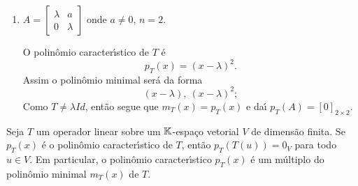 \begin{exemplo}
\begin{enumerate}[label={\arabic*})]
\begin{solucao}
\[\begin{bmatrix}
                    0 & 0 & -2 & 2
                \end{bmatrix}^2 = \begin{bmatrix}
                    0 & 0 & 0 & 0\\
                    0 & 0 & 0 & 0\\
                    0 & 0 & 0 & 0\\
                    0 & 0 & 0 & 0
                \end{bmatrix}.
            \]
            Logo o polin\^omio minimal de $T$ \'e
            \[
                m_T(x) = (x - 3)(x - 2)^2.
            \]
            Note que $p_T(x) = m_T(x)(x - 2)$ e assim $p_T(A) = [0]_{4 \times 4}$.
        \end{solucao}
        \item $A = \begin{bmatrix}
            \lambda & a\\
            0 & \lambda
        \end{bmatrix}$ onde $a \ne 0$, $n = 2$.
        \begin{solucao}
            O polin\^omio caracter{\'\i}stico de $T$ \'e
            \[
                p_T(x) = (x - \lambda)^2.
            \]
            Assim o polin\^omio minimal ser\'a da forma
            \[
                (x - \lambda),\ (x - \lambda)^2;
            \]
            Como $T \ne \lambda Id$, ent\~ao segue que $m_T(x) = p_T(x)$ e da{\'\i} $p_T(A) = [0]_{2 \times 2}$.
        \end{solucao}
    \end{enumerate}
\end{exemplo}

\begin{teorema}\label{TeoremaCayley-Hamilton}
    Seja $T$ um operador linear sobre um $\mathbb{K}$-espa\c{c}o vetorial $V$ de dimens\~ao finita. Se $p_T(x)$ \'e o polin\^omio caracter{\'\i}stico de $T$, ent\~ao $p_T(T(u)) = 0_V$ para todo $u \in V$. Em particular, o polin\^omio caracter{\'\i}stico $p_T(x)$ \'e um m\'ultiplo do polin\^omio minimal $m_T(x)$ de $T$.
\end{teorema}

